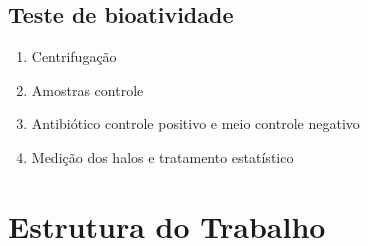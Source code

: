 \subsection{Teste de bioatividade}

\begin{enumerate}
    \item Centrifugação%
    \item Amostras controle%
    \item Antibiótico controle positivo e meio controle negativo%
    \item Medição dos halos e tratamento estatístico
\end{enumerate}



\section{Estrutura do Trabalho}



